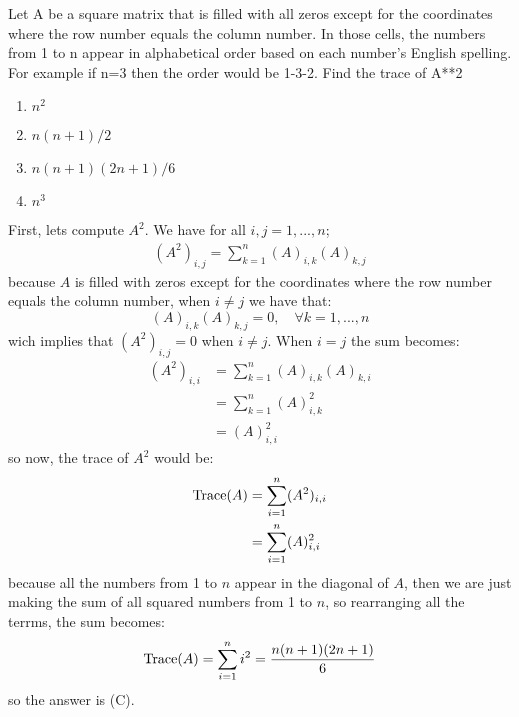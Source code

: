\documentclass[12pt]{report}
\newcounter{it}
\theoremstyle{largebreak}
\begin{document}
    \setcounter{section}{1}
    \setcounter{chapter}{1}

    \begin{excer}
        Let A be a square matrix that is filled with all zeros except for the coordinates where the row number equals the column number. In those cells, the numbers from 1 to n appear in alphabetical order based on each number's English spelling. For example if n=3 then the order would be 1-3-2. Find the trace of A**2
        \begin{enumerate}[label = \textit{(\Alph*)}]
            \item  $n^2$
            \item  $n(n+1)/2$
            \item  $n(n+1)(2n+1)/6$
            \item  $n^3$
        \end{enumerate}
    \end{excer}

    \begin{sol}
        First, lets compute $A^2$. We have for all $i,j=1,...,n$;
        \begin{equation*}
            \begin{split}
                (A^2)_{ i,j}=\sum_{ k=1}^n (A)_{ i,k}(A)_{ k,j}
            \end{split}
        \end{equation*}
        because $A$ is filled with zeros except for the coordinates where the row number equals the column number, when $i\neq j$ we have that:
        \begin{equation*}
            (A)_{ i,k}(A)_{ k,j}=0,\quad\forall k=1,...,n
        \end{equation*}
        wich implies that $(A^2)_{ i,j}=0$ when $i\neq j$. When $i=j$ the sum becomes:
        \begin{equation*}
            \begin{split}
                (A^2)_{ i,i}&=\sum_{ k=1}^n (A)_{ i,k}(A)_{ k,i}\\
                &=\sum_{ k=1}^n (A)_{ i,k}^2\\
                &=(A)_{i,i}^2
            \end{split}
        \end{equation*}
        so now, the trace of $A^2$ would be:
        \begin{equation*}
            \begin{split}
                \textup{Trace}(A)&=\sum_{ i=1}^n (A^2)_{i,i}\\
                &=\sum_{ i=1}^n (A)_{i,i}^2\\
            \end{split}
        \end{equation*}
        because all the numbers from 1 to $n$ appear in the diagonal of $A$, then we are just making the sum of all squared numbers from 1 to $n$, so rearranging all the terrms, the sum becomes:
        \begin{equation*}
            \textup{Trace}(A)=\sum_{ i=1}^n i^2=\frac{n(n+1)(2n+1)}{6}
        \end{equation*}
        so the answer is (C).
    \end{sol}
\end{document}
